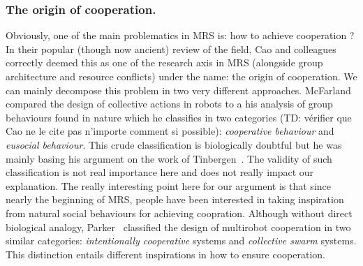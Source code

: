     \subsubsection{The origin of cooperation.} Obviously, one of the main problematics in MRS is: how to achieve cooperation ? In their popular (though now ancient) review of the field, Cao and colleagues~\parencite{Cao1997} correctly deemed this as one of the research axis in MRS (alongside group architecture and resource conflicts) under the name: the origin of cooperation. We can mainly decompose this problem in two very different approaches. McFarland~\parencite{McFarland1996} compared the design of collective actions in robots to a his analysis of group behaviours found in nature which he classifies in two categories (TD: vérifier que Cao ne le cite pas n'importe comment si possible): \emph{cooperative behaviour} and \emph{eusocial behaviour}. This crude classification is biologically doubtful but he was mainly basing his argument on the work of Tinbergen~\parencite{Tinbergen1953}. The validity of such classification is not real importance here and does not really impact our explanation. The really interesting point here for our argument is that since nearly the beginning of MRS, people have been interested in taking inspiration from natural social behaviours for achieving coopration. Although without direct biological analogy, Parker~\parencite{Parker2008} classified the design of multirobot cooperation in two similar categories: \emph{intentionally cooperative} systems and \emph{collective swarm} systems. This distinction entails different inspirations in how to ensure cooperation.

